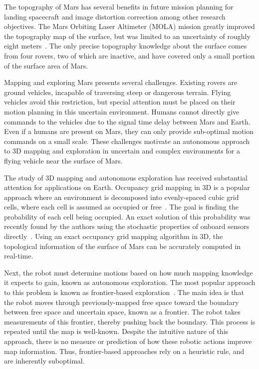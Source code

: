 \documentclass[conf]{new-aiaa}
\begin{document}
The topography of Mars has several benefits in future mission planning for landing spacecraft and  image distortion correction among other research objectives. The Mars Orbiting Laser Altimeter (MOLA) mission greatly improved the topography map of the surface, but was limited to an uncertainty of roughly eight meters~\cite{MOLA99}. The only precise topography knowledge about the surface comes from four rovers, two of which are inactive, and have covered only a small portion of the surface area of Mars.

Mapping and exploring Mars presents several challenges. Existing rovers are ground vehicles, incapable of traversing steep or dangerous terrain. Flying vehicles avoid this restriction, but special attention must be placed on their motion planning in this uncertain environment. Humans cannot directly give commands to the vehicles due to the signal time delay between Mars and Earth. Even if a humans are present on Mars, they can only provide sub-optimal motion commands on a small scale. These challenges motivate an autonomous approach to 3D mapping and exploration in uncertain and complex environments for a flying vehicle near the surface of Mars.

The study of 3D mapping and autonomous exploration has received substantial attention for applications on Earth. Occupancy grid mapping in 3D is a popular approach where an environment is decomposed into evenly-spaced cubic grid cells, where each cell is assumed as occupied or free~\cite{ThrBurFox05,WurHorBenStaBur10}. The goal is finding the probability of each cell being occupied. An exact solution of this probability was recently found by the authors using the stochastic properties of onboard sensors directly~\cite{KauLeeAiMos16,KauTakAiLee17}. Using an exact occupancy grid mapping algorithm in 3D, the topological information of the surface of Mars can be accurately computed in real-time.

Next, the robot must determine motions based on how much mapping knowledge it expects to gain, known as autonomous exploration. The most popular approach to this problem is known as frontier-based exploration~\cite{ZhuDinLinWu15,SenWan16,KleDor13}. The main idea is that the robot moves through previously-mapped free space toward the boundary between free space and uncertain space, known as a frontier. The robot takes measurements of this frontier, thereby pushing back the boundary. This process is repeated until the map is well-known. Despite the intuitive nature of this approach, there is no measure or prediction of how these robotic actions improve map information. Thus, frontier-based approaches rely on a heuristic rule, and are inherently suboptimal.
\end{document}
